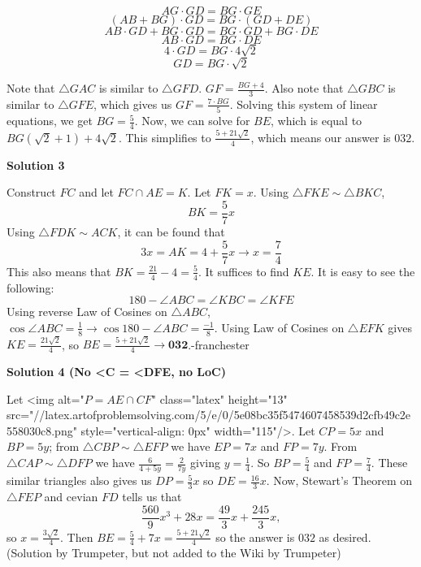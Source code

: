 \begin{enumerate}
 
 \[AG \cdot GD = BG \cdot GE\]
 \[(AB + BG) \cdot GD = BG \cdot (GD + DE)\]
 \[AB \cdot GD + BG \cdot GD = BG \cdot GD + BG \cdot DE\]
 \[AB \cdot GD = BG \cdot DE\]
 \[4 \cdot GD = BG \cdot 4\sqrt{2}\]
 \[GD = BG \cdot \sqrt{2}\]

 Note that $\triangle GAC$ is similar to $\triangle GFD$. $GF = \frac{BG + 4}{3}$. Also note that $\triangle GBC$ is similar to $\triangle GFE$, which gives us $GF = \frac{7 \cdot BG}{5}$. Solving this system of linear equations, we get $BG = \frac{5}{4}$. Now, we can solve for $BE$, which is equal to $BG(\sqrt{2} + 1) + 4\sqrt{2}$. This simplifies to $\frac{5 + 21\sqrt{2}}{4}$, which means our answer is $\boxed{032}$.

 



\textbf{Solution 3}

Construct $FC$ and let $FC\cap AE=K$. Let $FK=x$. Using $\triangle FKE\sim \triangle BKC$, 
 \[BK=\frac{5}{7}x\] Using $\triangle FDK\sim ACK$, it can be found that 
 \[3x=AK=4+\frac{5}{7}x\to x=\frac{7}{4}\] This also means that $BK=\frac{21}{4}-4=\frac{5}{4}$. It suffices to find $KE$. It is easy to see the following: 
 \[180-\angle ABC=\angle KBC=\angle KFE\] Using reverse Law of Cosines on $\triangle ABC$, $\cos{\angle ABC}=\frac{1}{8}\to \cos{180-\angle ABC}=\frac{-1}{8}$. Using Law of Cosines on $\triangle EFK$ gives $KE=\frac{21\sqrt 2}{4}$, so $BE=\frac{5+21\sqrt 2}{4}\to \boxed{\textbf{032}}$.-franchester

 



\textbf{Solution 4 (No <C = <DFE, no LoC)}

Let <img alt="$P=AE\cap CF$" class="latex" height="13" src="//latex.artofproblemsolving.com/5/e/0/5e08bc35f5474607458539d2cfb49c2e558030c8.png" style="vertical-align: 0px" width="115"/>. Let $CP=5x$ and $BP=5y$; from $\triangle{CBP}\sim\triangle{EFP}$ we have $EP=7x$ and $FP=7y$. From $\triangle{CAP}\sim\triangle{DFP}$ we have $\frac{6}{4+5y}=\frac{2}{7y}$ giving $y=\frac{1}{4}$. So $BP=\frac{5}{4}$ and $FP=\frac{7}{4}$. These similar triangles also gives us $DP=\frac{5}{3}x$ so $DE=\frac{16}{3}x$. Now, Stewart's Theorem on $\triangle{FEP}$ and cevian $FD$ tells us that 
 \[\frac{560}{9}x^3+28x=\frac{49}{3}x+\frac{245}{3}x,\]so $x=\frac{3\sqrt{2}}{4}$. Then $BE=\frac{5}{4}+7x=\frac{5+21\sqrt{2}}{4}$ so the answer is $\boxed{032}$ as desired. (Solution by Trumpeter, but not added to the Wiki by Trumpeter)

 




\end{enumerate}
